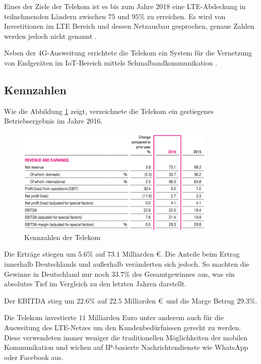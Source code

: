 Eines der Ziele der Telekom ist es bis zum Jahre 2018 eine LTE-Abdeckung in teilnehmenden Ländern zwischen $75$ und $95\%$ zu erreichen. Es wird von Investitionen im LTE Bereich und dessen Netzausbau gesprochen, genaue Zahlen werden jedoch nicht genannt \cite{telekomreport}.

Neben der 4G-Ausweitung errichtete die Telekom ein System für die Vernetzung von Endgeräten im IoT-Bereich mittels Schmalbandkommunikation \cite{telekomreport}.   

\subsection{Kennzahlen}

Wie die Abbildung \ref{fig:telekom_gewinn} zeigt, verzeichnete die Telekom ein gestiegenes Betriebsergebnis im Jahre 2016.

\begin{figure}[H]
\centering
\includegraphics[width=0.85\textwidth]{pictures/telekom_gewinn.png}
\caption{Kennzahlen der Telekom \cite{telekomreport}}
\label{fig:telekom_gewinn}
\end{figure}

Die Erträge stiegen um $5.6\%$ auf $73.1$ Milliarden \euro. Die Anteile beim Ertrag innerhalb Deutschlands und außerhalb veränderten sich jedoch. So machten die Gewinne in Deutschland nur noch $33.7\%$ des Gesamtgewinnes aus, was ein absolutes Tief im Vergleich zu den letzten Jahren darstellt.

Der EBITDA stieg um $22.6\%$ auf $22.5$ Milliarden \euro \ und die Marge Betrug $29.3\%$. 

Die Telekom investierte $11$ Milliarden Euro unter anderem auch für die Ausweitung des LTE-Netzes um den Kundenbedürfnissen gerecht zu werden. Diese verwendeten immer weniger die traditionellen Möglichkeiten der mobilen Kommunikation und wichen auf IP-basierte Nachrichtendienste wie WhatsApp oder Facebook aus.

